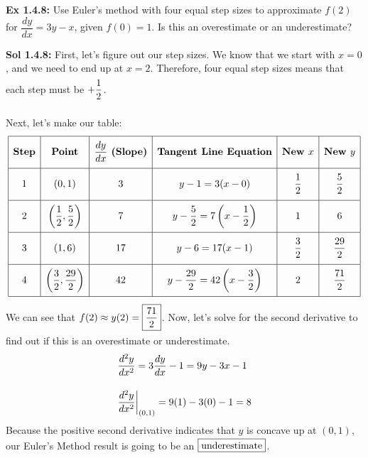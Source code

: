 \begin{tcolorbox}[example]
    \textbf{Ex 1.4.8: } Use Euler's method with four equal step sizes to approximate $f(2)$ for $\dfrac{dy}{dx} = 3y - x$, given $f(0) = 1$. Is this an overestimate or an underestimate?
\end{tcolorbox} 
\begin{tcolorbox}[solution]
    \textbf{Sol 1.4.8: } First, let's figure out our step sizes. We know that we start with $x = 0$, and we need to end up at $x = 2$. Therefore, four equal step sizes means that each step must be $+\dfrac{1}{2} \forcespace$. \par
    Next, let's make our table: \begin{align*}
        \def\arraystretch{2.2} 
        \begin{array}{|c|c|c|c|c|c|}
            \hline
            \textbf{Step} & \textbf{Point} & \dfrac{dy}{dx} \textbf{ (Slope)} & \textbf{Tangent Line Equation} & \textbf{New } x & \textbf{New } y \\[5.5pt] \hline
            1 & (0, 1) & 3 & y - 1 = 3(x - 0) & \dfrac{1}{2} & \dfrac{5}{2} \\[5.5pt] \hline
            2 & \left(\dfrac{1}{2}, \dfrac{5}{2}\right) & 7 & y - \dfrac{5}{2} = 7\left(x - \dfrac{1}{2}\right) & 1 & 6 \\[5.5pt] \hline
            3 & (1, 6) & 17 & y - 6 = 17(x - 1) & \dfrac{3}{2} & \dfrac{29}{2} \\[5.5pt] \hline
            4 & \left(\dfrac{3}{2}, \dfrac{29}{2}\right) & 42 & y - \dfrac{29}{2} = 42\left(x - \dfrac{3}{2}\right) & 2 & \dfrac{71}{2} \\[5.5pt]
            \hline
        \end{array}
    \end{align*}
    We can see that $f(2) \approx y(2) = \boxed{\dfrac{71}{2}} \forcespace$. Now, let's solve for the second derivative to find out if this is an overestimate or underestimate. \begin{align*}
        & \dfrac{d^2y}{dx^2} = 3\dfrac{dy}{dx} - 1 = 9y - 3x - 1 \\[11pt]
        & \dfrac{d^2y}{dx^2} \bigg|_{(0, 1)} = 9(1) - 3(0) - 1 = 8
    \end{align*}
    Because the positive second derivative indicates that $y$ is concave up at $(0, 1)$, our Euler's Method result is going to be an $\boxed{\text{underestimate}} \smallforcespace$.
\end{tcolorbox}

\newpage


